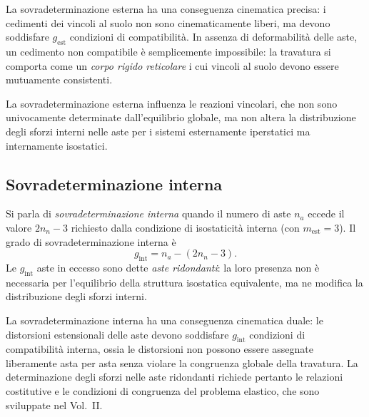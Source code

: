 La sovradeterminazione esterna ha una conseguenza
cinematica precisa: i cedimenti dei vincoli al suolo
non sono cinematicamente liberi, ma devono soddisfare
$g_\text{est}$ condizioni di compatibilità. In assenza
di deformabilità delle aste, un cedimento non
compatibile è semplicemente impossibile: la travatura
si comporta come un \emph{corpo rigido reticolare}
i cui vincoli al suolo devono essere mutuamente
consistenti.

La sovradeterminazione esterna influenza le reazioni
vincolari, che non sono univocamente determinate
dall'equilibrio globale, ma non altera la
distribuzione degli sforzi interni nelle aste
per i sistemi esternamente iperstatici ma
internamente isostatici.


\subsection{Sovradeterminazione interna}
\label{subsec:sovradet_int}

Si parla di \emph{sovradeterminazione interna} quando
il numero di aste $n_a$ eccede il valore $2n_n - 3$
richiesto dalla condizione di isostaticità interna
(con $m_\text{est} = 3$). Il grado di
sovradeterminazione interna è
\begin{equation}\label{eq:g_int}
	g_\text{int} = n_a - (2n_n - 3).
\end{equation}
Le $g_\text{int}$ aste in eccesso sono dette
\emph{aste ridondanti}: la loro presenza non è
necessaria per l'equilibrio della struttura
isostatica equivalente, ma ne modifica la
distribuzione degli sforzi interni.

La sovradeterminazione interna ha una conseguenza
cinematica duale: le distorsioni estensionali delle
aste devono soddisfare $g_\text{int}$ condizioni di
compatibilità interna, ossia le distorsioni non
possono essere assegnate liberamente asta per asta
senza violare la congruenza globale della travatura.
La determinazione degli sforzi nelle aste ridondanti
richiede pertanto le relazioni costitutive e le
condizioni di congruenza del problema elastico,
che sono sviluppate nel Vol.~II.


